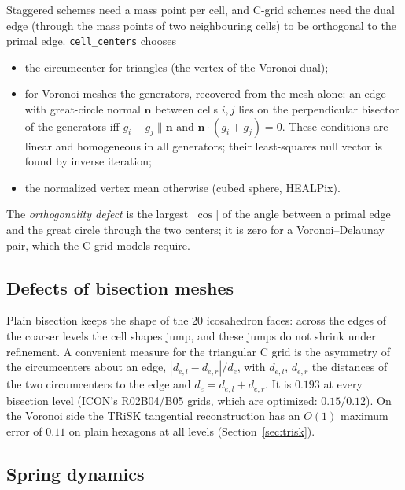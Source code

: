 \documentclass[11pt,a4paper]{article}
\newcommand{\bn}{\mathbf{n}}
\newcommand{\code}[1]{\texttt{#1}}
\begin{document}
Staggered schemes need a mass point per cell, and C-grid schemes need the
dual edge (through the mass points of two neighbouring cells) to be
orthogonal to the primal edge. \code{cell\_centers} chooses
\begin{itemize}
\item the circumcenter for triangles (the vertex of the Voronoi dual);
\item for Voronoi meshes the generators, recovered from the mesh alone: an edge
  with great-circle normal $\bn$ between cells $i,j$ lies on the perpendicular
  bisector of the generators iff $g_i - g_j\parallel\bn$ and
  $\bn\cdot(g_i+g_j) = 0$. These conditions are linear and homogeneous in all
  generators; their least-squares null vector is found by inverse iteration;
\item the normalized vertex mean otherwise (cubed sphere, HEALPix).
\end{itemize}
The \emph{orthogonality defect} is the largest $|\cos|$ of the angle between
a primal edge and the great circle through the two centers; it is zero for a
Voronoi--Delaunay pair, which the C-grid models require.

\subsection{Defects of bisection meshes}

Plain bisection keeps the shape of the 20 icosahedron faces: across the edges of
the coarser levels the cell shapes jump, and these jumps do not shrink under
refinement. A convenient measure for the triangular C grid is the asymmetry of
the circumcenters about an edge, $|d_{e,l}-d_{e,r}|/d_e$, with $d_{e,l}$,
$d_{e,r}$ the distances of the two circumcenters to the edge and
$d_e = d_{e,l} + d_{e,r}$. It is $0.193$ at every bisection level (ICON's
R02B04/B05 grids, which are optimized: $0.15/0.12$). On the Voronoi side the
TRiSK tangential reconstruction has an $O(1)$ maximum error of $0.11$ on plain
hexagons at all levels (Section~\ref{sec:trisk}).

\subsection{Spring dynamics}
\label{sec:spring}
\end{document}
